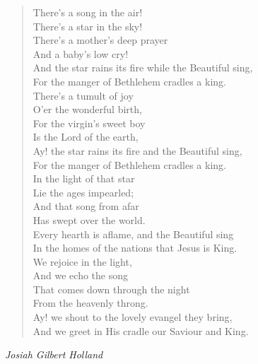 
\begin{verse}
There's a song in the air!\\
There's a star in the sky!\\
There's a mother's deep prayer\\
And a baby's low cry!\\
\hspace*{2em}And the star rains its fire while the Beautiful sing,\\
\hspace*{2em}For the manger of Bethlehem cradles a king.\\[0.7em]

There's a tumult of joy\\
O'er the wonderful birth,\\
For the virgin's sweet boy\\
Is the Lord of the earth,\\
\hspace*{2em}Ay! the star rains its fire and the Beautiful sing,\\
\hspace*{2em}For the manger of Bethlehem cradles a king.\\[0.7em]

In the light of that star\\
Lie the ages impearled;\\
And that song from afar\\
Has swept over the world.\\
\hspace*{2em}Every hearth is aflame, and the Beautiful sing\\
\hspace*{2em}In the homes of the nations that Jesus is King.\\[0.7em]

We rejoice in the light,\\
And we echo the song\\
That comes down through the night\\
From the heavenly throng.\\
\hspace*{2em}Ay! we shout to the lovely evangel they bring,\\
\hspace*{2em}And we greet in His cradle our Saviour and King.%
\end{verse}

\vspace{0.5\baselineskip}
\noindent\textit{Josiah Gilbert Holland}

\newpage

